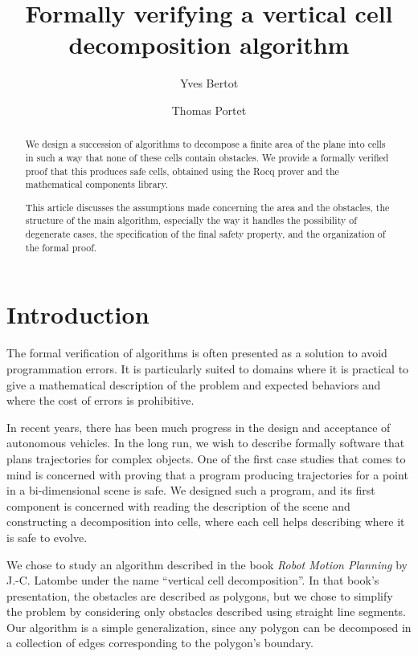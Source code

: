 \documentclass[a4paper, USenglish, cleveref, autoref, thm-restate]{lipics-v2021}
\title{Formally verifying a vertical cell decomposition algorithm}
\author{Yves Bertot}{Inria Center at Université Côte d'Azur, France}
       {yves.bertot@inria.fr}
       {https://orcid.org/0000-0001-5052-3019}{}
\author{Thomas Portet}{Inria Center at Université Côte d'Azur, France}
       {thomas.portet@inria.fr}
       {}{}
\begin{document}
\maketitle

\begin{abstract}
We design a succession of algorithms to decompose a finite area of the
plane into cells in such a way that none of these cells contain obstacles.
We provide a formally verified proof that this produces safe cells,
obtained using the Rocq prover and the mathematical components library.

This article discusses the assumptions made concerning the area and the
obstacles, the structure of the main algorithm, especially the way it handles
the possibility of degenerate cases, the specification of the final safety
property, and the organization of the formal proof.
\end{abstract}

\section{Introduction}
The formal verification of algorithms is often presented as a solution
to avoid programmation errors.  It is particularly suited to domains
where it is practical to give a mathematical description of the
problem and expected behaviors and where the cost of errors is
prohibitive.

In recent years, there has been much progress in the design and
acceptance of autonomous vehicles.
In the long run, we wish to describe formally 
software that plans trajectories
for complex objects.  One of the first case studies that comes to mind
is concerned with proving that a program producing trajectories for a
point in a bi-dimensional scene is safe.  We designed such a program,
and its first component is concerned with reading the description of
the scene and constructing a decomposition into cells, where each cell
helps describing where it is safe to evolve.

We chose to study an algorithm described in the book {\em Robot Motion
  Planning} by J.-C. Latombe under the name ``vertical cell
decomposition''.  In that book's presentation, the obstacles are
described as polygons, but we chose to simplify the problem by
considering only obstacles described using straight line segments.
Our algorithm is a simple generalization, since any polygon can be
decomposed in a collection of edges corresponding to the polygon's
boundary.
\end{document}
